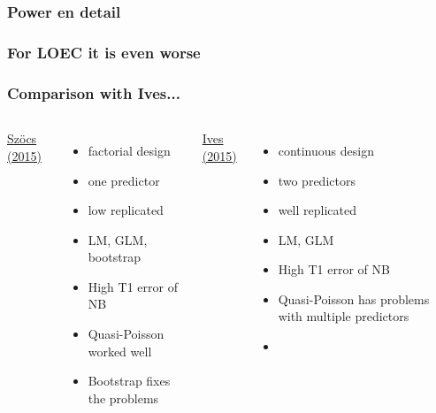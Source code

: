 \documentclass[
	10pt
	]{beamer}
\begin{document}
\appendix

\begin{frame}
\frametitle{Power en detail}
	\begin{adjustbox}{max totalsize={\textwidth}{\textheight}}
				
	\end{adjustbox}
\end{frame}


\begin{frame}
\frametitle{For LOEC it is even worse}
	\begin{adjustbox}{max totalsize={\textwidth}{\textheight}}
				
	\end{adjustbox}
\end{frame}


\begin{frame}
\frametitle{Comparison with Ives...}
	\begin{columns}
	    	\underline{Szöcs (2015)}
	    	\begin{itemize}
	        	\item factorial design
	        	\item one predictor
	        	\item low replicated
	        	\item LM, GLM, bootstrap
	        	\item High T1 error of NB
	        	\item Quasi-Poisson worked well \vspace{1.2em}
	        	\item Bootstrap fixes the problems
	        \end{itemize}
	    	\underline{Ives (2015)}
	        \begin{itemize}
	        	\item continuous design
	        	\item two predictors
	        	\item well replicated
	        	\item LM, GLM
	        	\item High T1 error of NB
	        	\item Quasi-Poisson has problems with multiple predictors
	        	\item
	        \end{itemize}
	\end{columns}
\end{frame}
\end{document}
